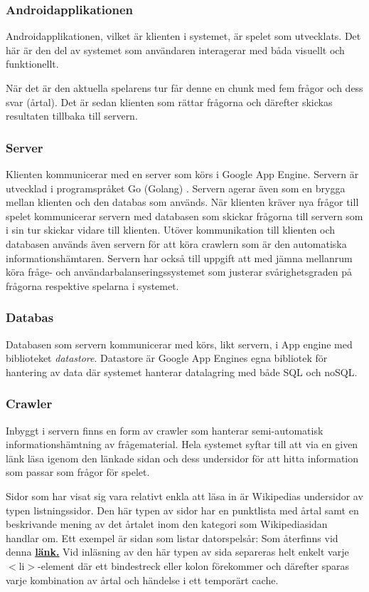 \documentclass[a4paper, 11pt]{article}
\begin{document}
\subsubsection{Androidapplikationen}
Androidapplikationen, vilket är klienten i systemet, är spelet som utvecklats. Det här är den del av systemet som användaren interagerar med båda visuellt och funktionellt.

När det är den aktuella spelarens tur får denne en chunk med fem frågor och dess svar (årtal). Det är sedan klienten som rättar frågorna och därefter skickas resultaten tillbaka till servern.
\subsubsection{Server}
Klienten kommunicerar med en server som körs i Google App Engine. Servern är utvecklad i programspråket Go (Golang) \cite{golang}. Servern agerar även som en brygga mellan klienten och den databas som används. När klienten kräver nya frågor till spelet kommunicerar servern med databasen som skickar frågorna till servern som i sin tur skickar vidare till klienten. Utöver kommunikation till klienten och databasen används även servern för att köra crawlern som är den automatiska informationshämtaren. Servern har också till uppgift att med jämna mellanrum köra fråge- och användarbalanseringssystemet som justerar svårighetsgraden på frågorna respektive spelarna i systemet. 
\subsubsection{Databas}
Databasen som servern kommunicerar med körs, likt servern, i App engine med biblioteket \textit{datastore}. Datastore är Google App Engines egna bibliotek för hantering av data där systemet hanterar datalagring med både SQL och noSQL.
\subsubsection{Crawler}
Inbyggt i servern finns en form av crawler som hanterar semi-automatisk informationshämtning av frågematerial. Hela systemet syftar till att via en given länk läsa igenom den länkade sidan och dess undersidor för att hitta information som passar som frågor för spelet. 

Sidor som har visat sig vara relativt enkla att läsa in är Wikipedias undersidor av typen listningssidor. Den här typen av sidor har en punktlista med årtal samt en beskrivande mening av det årtalet inom den kategori som Wikipediasidan handlar om. Ett exempel är sidan som listar datorspelsår: Som återfinns vid denna  \textbf{\href{http://sv.wikipedia.org/wiki/Lista_\%C3\%B6ver_datorspels\%C3\%A5r}{länk.}} 
Vid inläsning av den här typen av sida separeras helt enkelt varje $<$li$>$-element där ett bindestreck eller kolon förekommer och därefter sparas varje kombination av årtal och händelse i ett temporärt cache.
\end{document}
